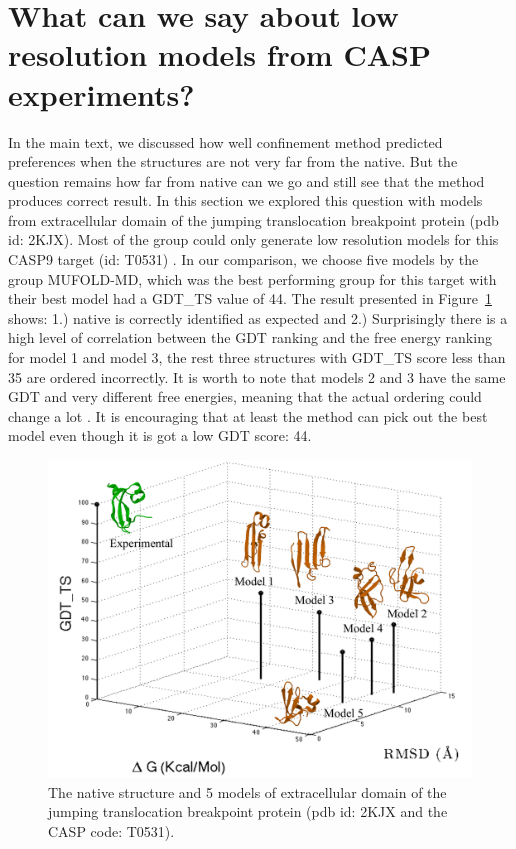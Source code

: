 \documentclass[12pt]{article}
\begin{document}
\section{What can we say about low resolution models from CASP experiments?}

In the main text, we discussed how well confinement method predicted preferences when the structures are not very far from the
native. But the question remains how far from native can we go and still see that the method produces correct result. In
this section we explored this question with models from  extracellular domain of the jumping translocation breakpoint
protein (pdb id: 2KJX). Most of the group could only generate low resolution models for this CASP9 target (id: T0531) .
In our comparison, we choose five models by the group MUFOLD-MD, which was the best performing group for this target
with their best model had a GDT\_TS value of 44. The result presented in Figure~\ref{fig:T0531} shows: 1.) native is
correctly identified as expected and 2.) Surprisingly there is a high level of correlation between the GDT ranking and
the free energy ranking for model 1 and model 3, the rest three structures with GDT\_TS score less than 35  are ordered
incorrectly. It is worth to note that models 2 and 3 have the same GDT and very different free energies, meaning that
the actual ordering could change a lot \cite{Perez2012}. It is encouraging that at least the method can pick out the
best model even though it is got a low GDT score: 44.

\begin{figure}
\begin{center}
\includegraphics[width=3.5 in]{T0531.pdf}
\end{center}
\caption{The native structure and 5 models of extracellular domain of the jumping translocation breakpoint protein (pdb
    id: 2KJX and the CASP code: T0531).}
\label{fig:T0531}
\end{figure}
\end{document}
